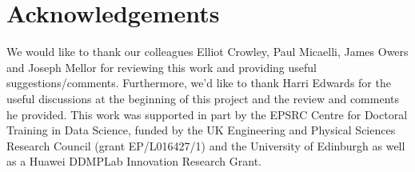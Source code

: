\documentclass{article} \usepackage[dvipsnames]{xcolor}
\begin{document}
\section{Acknowledgements}
We would like to thank our colleagues Elliot Crowley, Paul Micaelli, James Owers and Joseph Mellor for reviewing this work and providing useful suggestions/comments. Furthermore, we'd like to thank Harri Edwards for the useful discussions at the beginning of this project and the review and comments he provided. This work was supported in part by the EPSRC Centre for Doctoral Training in Data Science, funded by the UK Engineering and Physical Sciences Research Council (grant EP/L016427/1) and the University of Edinburgh as well as a Huawei DDMPLab Innovation Research Grant. 


































































\end{document}
